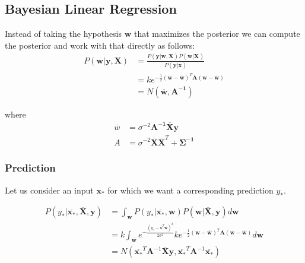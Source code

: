 \documentclass[12pt]{article}
\begin{document}
    \subsection{Bayesian Linear Regression}
        Instead of taking the hypothesis $\boldsymbol{w}$ that maximizes the posterior we can compute the posterior and work with that directly as follows:
        \begin{align*}
            P(\boldsymbol{w}|\boldsymbol{y}, \boldsymbol{X}) &= \frac{P(\boldsymbol{y}|\boldsymbol{w}, \boldsymbol{X})P(\boldsymbol{w}|\boldsymbol{X})}{P(\boldsymbol{y}|\boldsymbol{x})} \\
            &= ke^{-\frac{1}{2}(\boldsymbol{w}-\overline{\boldsymbol{w}})^T\boldsymbol{A}(\boldsymbol{w}-\overline{\boldsymbol{w}})} \\
            &= N(\overline{\boldsymbol{w}}, \boldsymbol{A^{-1}})
        \end{align*}

        where
        \begin{align*}
        \overline{w} &= \sigma^{-2}\boldsymbol{A^{-1}}\overline{\boldsymbol{X}}\boldsymbol{y} \\
        A &= \sigma^{-2}\boldsymbol{\overline{X}\overline{X}}^T + \boldsymbol{\Sigma^{-1}}
        \end{align*}

        \subsubsection{Prediction}
            Let us consider an input $\boldsymbol{x_*}$ for which we want a corresponding prediction $y_*$.

            \begin{align*}
                P(y_*|\overline{\boldsymbol{x_*}}, \overline{\boldsymbol{X}}, \boldsymbol{y}) &= \int_{\boldsymbol{w}} P(y_*|\overline{\boldsymbol{x_*}},\boldsymbol{w})P(\boldsymbol{w}|\overline{\boldsymbol{X}},\boldsymbol{y})d\boldsymbol{w} \\
                &= k \int_{\boldsymbol{w}} e^{-\frac{(y_* - \overline{\boldsymbol{x}}^T\boldsymbol{w})^2}{2\sigma^2}} ke^{-\frac{1}{2}(\boldsymbol{w}-\overline{\boldsymbol{w}})^T\boldsymbol{A}(\boldsymbol{w}-\overline{\boldsymbol{w}})}d\boldsymbol{w} \\
                &= N(\overline{\boldsymbol{x_*}}^T \boldsymbol{A}^{-1}\overline{\boldsymbol{X}}\boldsymbol{y}, \overline{\boldsymbol{x_*}}^T \boldsymbol{A}^{-1} \overline{\boldsymbol{x_*}})
            \end{align*}
\end{document}
